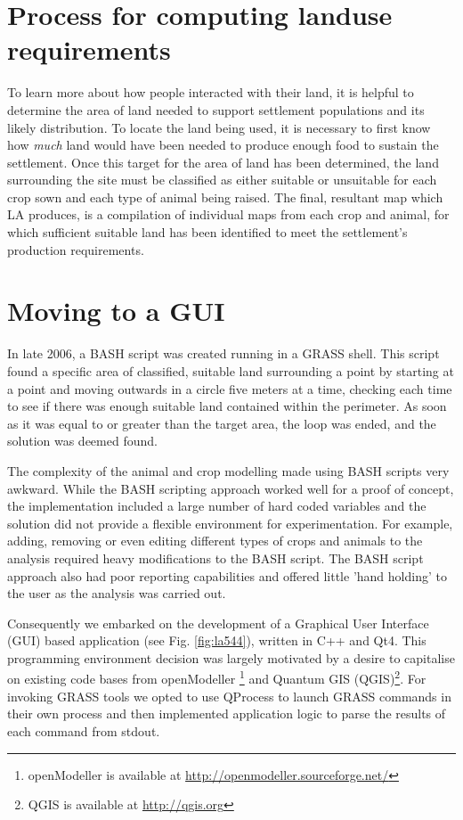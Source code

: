 \section{Process for computing landuse requirements} 
\label{sec:EarlyAttempts} 

  To learn more about how people interacted with their land, it is
  helpful to determine the area of land needed to support settlement
  populations and its likely distribution.  To locate the land being used, it is
  necessary to first know how \textit{much} land would have been needed to produce
  enough food to sustain the settlement.  Once this target for the area of land
  has been determined, the land surrounding the site must be classified as either
  suitable or unsuitable for each crop sown and each type of animal being raised.  
  The final, resultant map which LA produces, is a compilation of individual maps 
  from each crop and animal, for which sufficient suitable land has been identified
  to meet the settlement's production requirements.

\section{Moving to a GUI} \label{GUI} 

  In late 2006, a BASH script was created running in a GRASS shell. This script
  found a specific area of classified, suitable land surrounding a point by
  starting at a point and moving outwards in a circle five meters at a time,
  checking each time to see if there was enough suitable land contained within the
  perimeter. As soon as it was equal to or greater than the target area, the loop
  was ended, and the solution was deemed found.
  
  The complexity of the animal and crop modelling made using BASH scripts very
  awkward.  While the BASH scripting approach worked well for a proof of concept,
  the implementation included a large number of hard coded variables and the
  solution did not provide a flexible environment for experimentation. For
  example, adding, removing or even editing different types of crops and animals
  to the analysis required heavy modifications to the BASH script.  The BASH
  script approach also had poor reporting capabilities and offered
  little 'hand holding' to the user as the analysis was carried out.
  
  Consequently we embarked on the development of a Graphical User Interface (GUI)
  based application (see Fig. \ref{fig:la544}), written in C++ and Qt4. This
  programming environment decision was largely motivated by a desire to
  capitalise on existing code bases from openModeller \footnote{openModeller is
  available at \url{http://openmodeller.sourceforge.net/}} and Quantum GIS
  (QGIS)\footnote{QGIS is available at \url{http://qgis.org}}.  For invoking
  GRASS tools we opted to use QProcess to launch GRASS commands in their own
  process and then implemented application logic to parse the results of each
  command from stdout.

